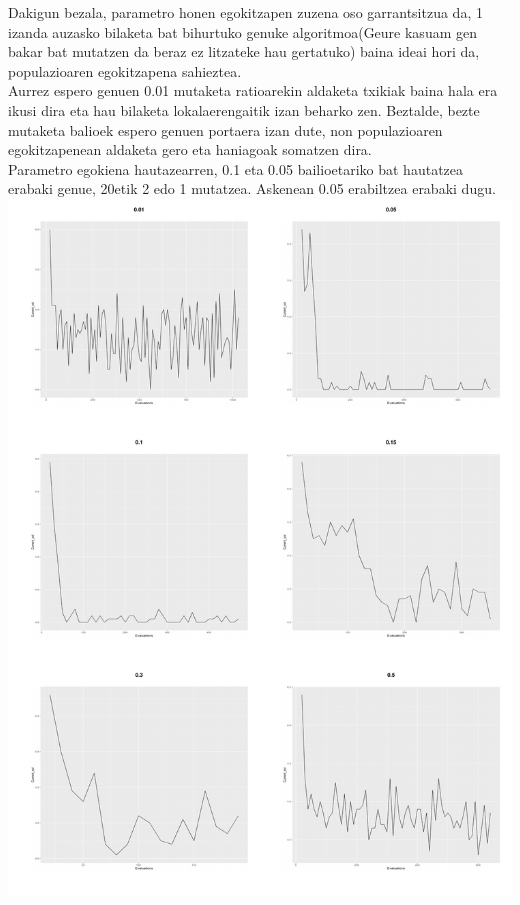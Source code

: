 \documentclass[eu,gi]{ifirak}\usepackage[]{graphicx}\usepackage[]{color}
\makeatletter
\def\maxwidth{ %
  \ifdim\Gin@nat@width>\linewidth
    \linewidth
  \else
    \Gin@nat@width
  \fi
}
\newenvironment{knitrout}{}{} %
\makeatother
\begin{document}
Dakigun bezala, parametro honen egokitzapen zuzena oso garrantsitzua da, 1 izanda auzasko bilaketa bat bihurtuko genuke algoritmoa(Geure kasuam gen bakar bat mutatzen da beraz ez litzateke hau gertatuko) baina ideai hori da, populazioaren egokitzapena sahieztea. \\

Aurrez espero genuen 0.01 mutaketa ratioarekin aldaketa txikiak baina hala era ikusi dira eta hau bilaketa lokalaerengaitik izan beharko zen. Beztalde, bezte mutaketa balioek espero genuen portaera izan dute, non populazioaren egokitzapenean aldaketa gero eta haniagoak somatzen dira.\\

Parametro egokiena hautazearren, 0.1 eta 0.05 bailioetariko bat hautatzea erabaki genue, 20etik 2 edo 1 mutatzea. Askenean 0.05 erabiltzea erabaki dugu.\\


\begin{knitrout}
\color{fgcolor}
\includegraphics[width=\maxwidth]{figure/unnamed-chunk-21-1} 

\end{knitrout}
\end{document}
